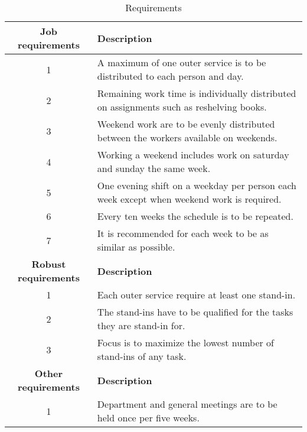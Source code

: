 \begin{table}[H]
\caption{Requirements}
\label{int:3}
\begin{tabular}{|c|l|}
\hline
\textbf{Job requirements} & \textbf{Description} \\ \hline
1 & A maximum of one outer service is to be distributed to each person and day.
\\ \hline 
2 & Remaining work time is individually distributed on assignments such as reshelving books.
\\ \hline
3 & Weekend work are to be evenly distributed between the workers available on weekends. 
\\ \hline 
4 & Working a weekend includes work on saturday and sunday the same week.
\\ \hline 
5 & One evening shift on a weekday per person each week except when weekend work is required.
\\ \hline 
6 & Every ten weeks the schedule is to be repeated.
\\ \hline 
7 & It is recommended for each week to be as similar as possible.
\\ \hline 

\textbf{Robust requirements} & \textbf{Description} \\ \hline
1 & Each outer service require at least one stand-in.
\\ \hline 
2 & The stand-ins have to be qualified for the tasks they are stand-in for.
\\ \hline 
3 & Focus is to maximize the lowest number of stand-ins of any task.
\\ \hline 

\textbf{Other requirements} & \textbf{Description} \\ \hline
1 & Department and general meetings are to be held once per five weeks.
\\ \hline 
\end{tabular}
\end{table}
\medskip

